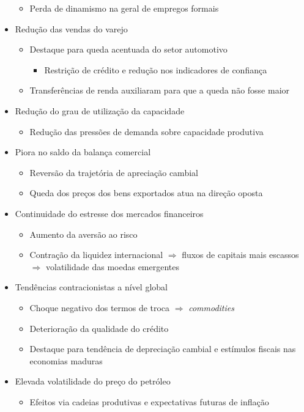 \documentclass[11pt]{article}
\begin{document}
\begin{itemize}
\begin{itemize}
\item Perda de dinamismo na geral de empregos formais
\end{itemize}
\item Redução das vendas do varejo
\begin{itemize}
\item Destaque para queda acentuada do setor automotivo
\begin{itemize}
\item Restrição de crédito e redução nos indicadores de confiança
\end{itemize}
\item Transferências de renda auxiliaram para que a queda não fosse maior
\end{itemize}
\item Redução do grau de utilização da capacidade
\begin{itemize}
\item Redução das pressões de demanda sobre capacidade produtiva
\end{itemize}
\item Piora no saldo da balança comercial
\begin{itemize}
\item Reversão da trajetória de apreciação cambial
\item Queda dos preços dos bens exportados atua na direção oposta
\end{itemize}
\item Continuidade do estresse dos mercados financeiros
\begin{itemize}
\item Aumento da aversão ao risco
\item Contração da liquidez internacional \(\Rightarrow\) fluxos de capitais mais escassos \(\Rightarrow\) volatilidade das moedas emergentes
\end{itemize}
\item Tendências contracionistas a nível global
\begin{itemize}
\item Choque negativo dos termos de troca \(\Rightarrow\) \emph{commodities}
\item Deterioração da qualidade do crédito
\item Destaque para tendência de depreciação cambial e estímulos fiscais nas economias maduras
\end{itemize}
\item Elevada volatilidade do preço do petróleo
\begin{itemize}
\item Efeitos via cadeias produtivas e expectativas futuras de inflação
\end{itemize}
\end{itemize}
\end{document}

